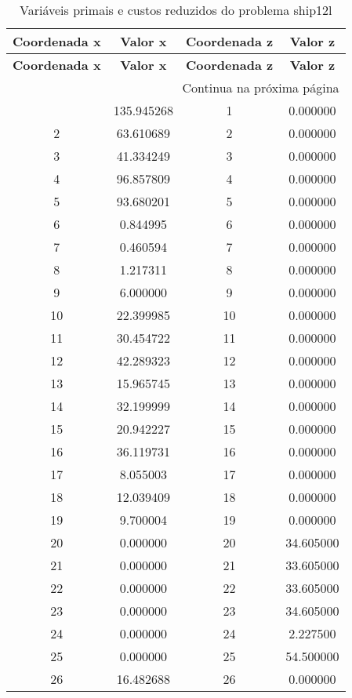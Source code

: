 \documentclass[12pt]{article}
\begin{document}
\begin{longtable}{@{}cccc@{}}
\caption{Variáveis primais e custos reduzidos do problema ship12l} \\
\toprule
\textbf{Coordenada x} & \textbf{Valor x} & \textbf{Coordenada z} & \textbf{Valor z} \\
\midrule
\endfirsthead

\toprule
\textbf{Coordenada x} & \textbf{Valor x} & \textbf{Coordenada z} & \textbf{Valor z} \\
\midrule
\endhead

\midrule \multicolumn{4}{r}{{Continua na próxima página}} \\ \midrule
\endfoot

\bottomrule
\endlastfoot
1 & 135.945268 & 1 & 0.000000 \\
2 & 63.610689 & 2 & 0.000000 \\
3 & 41.334249 & 3 & 0.000000 \\
4 & 96.857809 & 4 & 0.000000 \\
5 & 93.680201 & 5 & 0.000000 \\
6 & 0.844995 & 6 & 0.000000 \\
7 & 0.460594 & 7 & 0.000000 \\
8 & 1.217311 & 8 & 0.000000 \\
9 & 6.000000 & 9 & 0.000000 \\
10 & 22.399985 & 10 & 0.000000 \\
11 & 30.454722 & 11 & 0.000000 \\
12 & 42.289323 & 12 & 0.000000 \\
13 & 15.965745 & 13 & 0.000000 \\
14 & 32.199999 & 14 & 0.000000 \\
15 & 20.942227 & 15 & 0.000000 \\
16 & 36.119731 & 16 & 0.000000 \\
17 & 8.055003 & 17 & 0.000000 \\
18 & 12.039409 & 18 & 0.000000 \\
19 & 9.700004 & 19 & 0.000000 \\
20 & 0.000000 & 20 & 34.605000 \\
21 & 0.000000 & 21 & 33.605000 \\
22 & 0.000000 & 22 & 33.605000 \\
23 & 0.000000 & 23 & 34.605000 \\
24 & 0.000000 & 24 & 2.227500 \\
25 & 0.000000 & 25 & 54.500000 \\
26 & 16.482688 & 26 & 0.000000 \\

\end{longtable}
\end{document}
